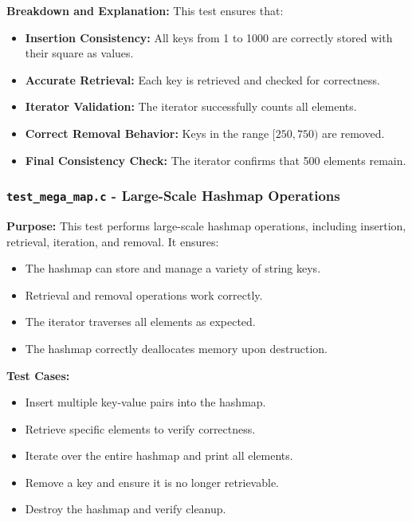 \documentclass[titlepage]{article}
\begin{document}
\textbf{Breakdown and Explanation:}
This test ensures that:
\begin{itemize}
    \item \textbf{Insertion Consistency:} All keys from 1 to 1000 are correctly stored with their square as values.
    \item \textbf{Accurate Retrieval:} Each key is retrieved and checked for correctness.
    \item \textbf{Iterator Validation:} The iterator successfully counts all elements.
    \item \textbf{Correct Removal Behavior:} Keys in the range $[250, 750)$ are removed.
    \item \textbf{Final Consistency Check:} The iterator confirms that 500 elements remain.
\end{itemize}

\subsubsection{\texttt{test\_mega\_map.c} - Large-Scale Hashmap Operations}

\textbf{Purpose:}
This test performs large-scale hashmap operations, including insertion, retrieval, iteration, and removal.
It ensures:
\begin{itemize}
    \item The hashmap can store and manage a variety of string keys.
    \item Retrieval and removal operations work correctly.
    \item The iterator traverses all elements as expected.
    \item The hashmap correctly deallocates memory upon destruction.
\end{itemize}

\textbf{Test Cases:}
\begin{itemize}
    \item Insert multiple key-value pairs into the hashmap.
    \item Retrieve specific elements to verify correctness.
    \item Iterate over the entire hashmap and print all elements.
    \item Remove a key and ensure it is no longer retrievable.
    \item Destroy the hashmap and verify cleanup.
\end{itemize}
\end{document}
